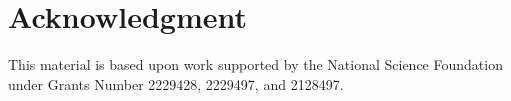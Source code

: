 \section{Acknowledgment}
\label{section:hardware:acknowledgment}

This material is based upon work supported by the National Science Foundation under Grants Number 2229428, 2229497, and 2128497.
